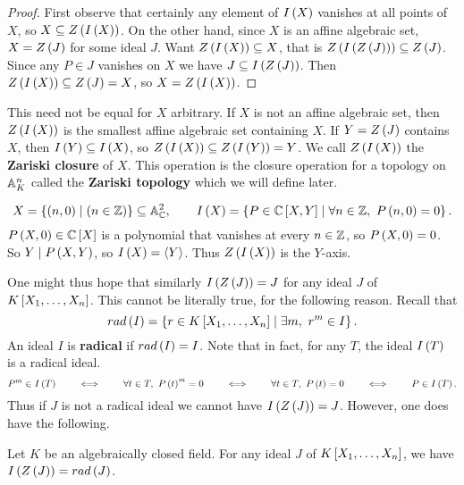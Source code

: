 \begin{proof}
First observe that certainly any element of $ I\rb{X} $ vanishes at all points of $ X $, so $ X \subseteq Z\rb{I\rb{X}} $. On the other hand, since $ X $ is an affine algebraic set, $ X = Z\rb{J} $ for some ideal $ J $. Want $ Z\rb{I\rb{X}} \subseteq X $, that is $ Z\rb{I\rb{Z\rb{J}}} \subseteq Z\rb{J} $. Since any $ P \in J $ vanishes on $ X $ we have $ J \subseteq I\rb{Z\rb{J}} $. Then $ Z\rb{I\rb{X}} \subseteq Z\rb{J} = X $, so $ X = Z\rb{I\rb{X}} $.
\end{proof}

This need not be equal for $ X $ arbitrary. If $ X $ is not an affine algebraic set, then $ Z\rb{I\rb{X}} $ is the smallest affine algebraic set containing $ X $. If $ Y = Z\rb{J} $ contains $ X $, then $ I\rb{Y} \subseteq I\rb{X} $, so $ Z\rb{I\rb{X}} \subseteq Z\rb{I\rb{Y}} = Y $. We call $ Z\rb{I\rb{X}} $ the \textbf{Zariski closure} of $ X $. This operation is the closure operation for a topology on $ \A_K^n $ called the \textbf{Zariski topology} which we will define later.

\begin{example2}
$$ X = \cb{\rb{n, 0} \mid \rb{n \in \Z}} \subseteq \A_\C^2, \qquad I\rb{X} = \cb{P \in \C\sb{X, Y} \mid \forall n \in \Z, \ P\rb{n, 0} = 0}. $$
$ P\rb{X, 0} \in \C\sb{X} $ is a polynomial that vanishes at every $ n \in \Z $, so $ P\rb{X, 0} = 0 $. So $ Y \mid P\rb{X, Y} $, so $ I\rb{X} = \ab{Y} $. Thus $ Z\rb{I\rb{X}} $ is the $ Y $-axis.
\end{example2}

One might thus hope that similarly $ I\rb{Z\rb{J}} = J $ for any ideal $ J $ of $ K\sb{X_1, \dots, X_n} $. This cannot be literally true, for the following reason. Recall that
$$ rad\rb{I} = \cb{r \in K\sb{X_1, \dots, X_n} \mid \exists m, \ r^m \in I}. $$
An ideal $ I $ is \textbf{radical} if $ rad\rb{I} = I $. Note that in fact, for any $ T $, the ideal $ I\rb{T} $ is a radical ideal.
$$ P^m \in I\rb{T} \qquad \iff \qquad \forall t \in T, \ P\rb{t}^m = 0 \qquad \iff \qquad \forall t \in T, \ P\rb{t} = 0 \qquad \iff \qquad P \in I\rb{T}. $$
Thus if $ J $ is not a radical ideal we cannot have $ I\rb{Z\rb{J}} = J $. However, one does have the following.

\begin{theorem}
\label{thm:13.2.5}
Let $ K $ be an algebraically closed field. For any ideal $ J $ of $ K\sb{X_1, \dots, X_n} $, we have $ I\rb{Z\rb{J}} = rad\rb{J} $.
\end{theorem}

